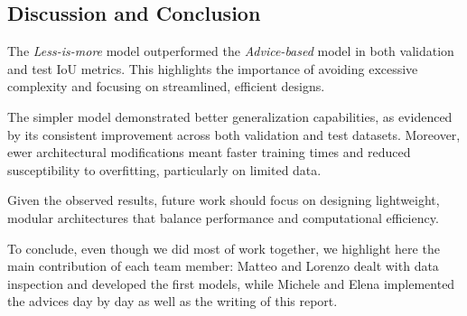 \documentclass[11pt]{article}
\begin{document}
\begin{multicols*}{2}

    \section{Discussion and Conclusion} %
    \label{sec:discussion}

    The \emph{Less-is-more} model outperformed the \emph{Advice-based} model in both validation and test IoU metrics. This highlights the importance of avoiding excessive complexity and focusing on streamlined, efficient designs.

    The simpler model demonstrated better generalization capabilities, as evidenced by its consistent improvement across both validation and test datasets.
    Moreover, ewer architectural modifications meant faster training times and reduced susceptibility to overfitting, particularly on limited data.

    Given the observed results, future work should focus on designing lightweight, modular architectures that balance performance and computational efficiency.

    To conclude, even though we did most of work together, we highlight here the main contribution of each team member: Matteo and Lorenzo dealt with data inspection and developed the first models, while Michele and Elena implemented the advices day by day as well as the writing of this report.

    
    
    
    
    \end{multicols*}
\end{document}

